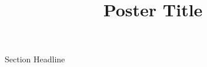 \documentclass{tugPoster}
\title{Poster Title}
\begin{document}
	\maketitle

	\begin{IPTblock}[twocol]{Section Headline}
		\lipsum[1]
	\IPTcolbreak
		\lipsum[2]
		\lipsum[4]
	\end{IPTblock}
\end{document}
